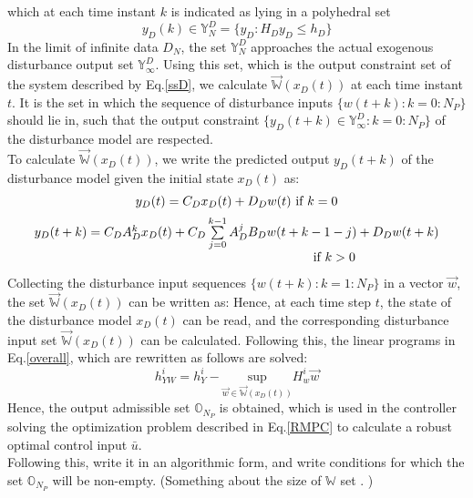 \documentclass[letterpaper, 10 pt, conference]{ieeeconf}  %
\begin{document}
	which at each time instant $k$ is indicated as lying in a polyhedral set
	\begin{equation}
	y_D(k) \in \mathbb{Y}^D_N = \{y_D:H_Dy_D \leq h_D\}
	\end{equation}
	In the limit of infinite data $D_N$, the set $\mathbb{Y}_N^D$ approaches the actual exogenous disturbance output set $\mathbb{Y}_{\infty}^D$. Using this set, which is the output constraint set of the system described by Eq.\eqref{ssD}, we calculate $\vec{\mathbb{W}}(x_D(t))$ at each time instant $t$. It is the set in which the sequence of disturbance inputs $\{w(t+k):k=0:N_P\}$ should lie in, such that the output constraint $\{y_D(t+k)\in \mathbb{Y}_{\infty}^D:k=0:N_P\}$ of the disturbance model are respected. \\
	To calculate $\vec{\mathbb{W}}(x_D(t))$, we write the predicted output $y_D(t+k)$ of the disturbance model given the initial state $x_D(t)$ as:
	\begin{equation}
	\small
	\begin{matrix}
	y_D(t)=C_Dx_D(t)+D_Dw(t) \text{ if } k=0 \vspace{5pt} \\
	y_D(t+k)=C_DA_D^{k}x_D(t)+ C_D\sum\limits_{j=0}^{k-1}A_D^jB_Dw(t+k-1-j)+D_Dw(t+k) \\ \hspace{150pt}\text{ if } k>0
	\end{matrix}
	\end{equation}
    Collecting the disturbance input sequences  $\{w(t+k):k=1:N_P\}$ in a vector $\vec{w}$, the set $\vec{\mathbb{W}}(x_D(t))$ can be written as:     
    Hence, at each time step $t$, the state of the disturbance model $x_D(t)$ can be read, and the corresponding disturbance input set $\vec{\mathbb{W}}(x_D(t))$ can be calculated. Following this, the linear programs in  Eq.\eqref{overall}, which are rewritten as follows are solved:
    \begin{equation}
    h_{YW}^i = h_Y^i-\underset{\vec{w}\in \vec{\mathbb{W}}(x_D(t))}{\text{sup}} H_w^i \vec{w}  
    \end{equation}     
    Hence, the output admissible set $\mathbb{O}_{N_P}$ is obtained, which is used in the controller solving the optimization problem described in Eq.\eqref{RMPC} to calculate a robust optimal control input $\bar{u}$.
    \\
    {\color{blue} Following this, write it in an algorithmic form, and write conditions for which the set $\mathbb{O}_{N_P}$ will be non-empty. (Something about the size of $\mathbb{W}$ set . )
}
\end{document}
